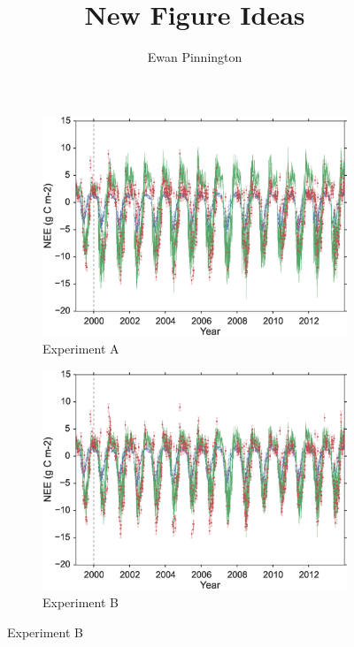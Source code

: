 \documentclass[11pt]{article}
\title{New Figure Ideas}
\author{Ewan Pinnington}
\begin{document}
\maketitle


\begin{figure}
    \centering
    \begin{subfigure}[b]{0.49\textwidth}
        \includegraphics[width=\textwidth]{A4dvar.eps}
        \caption{Experiment A}
        \label{fig:4dvardiagBR}
    \end{subfigure}
    \begin{subfigure}[b]{0.49\textwidth}
        \includegraphics[width=\textwidth]{B4dvar.eps}
        \caption{Experiment B}
        \label{fig:4dvaredcBR}
    \end{subfigure}

\end{figure}
\end{document}
